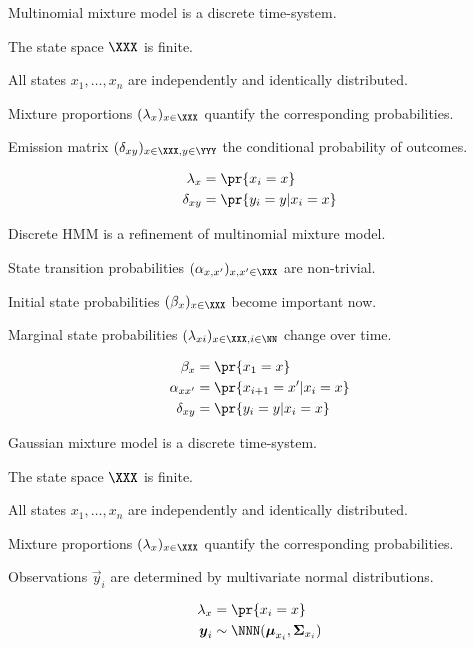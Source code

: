 \documentclass[landscape,footrule]{foils}
\begin{document}



Multinomial mixture model is a discrete time-system.
\begin{triangles}
\item The state space $\XXX$ is finite.
\item All states $x_1,\ldots,x_n$ are independently and identically distributed.
\item Mixture proportions $(\lambda_{x})_{x\in\XXX}$ quantify the corresponding probabilities.
\item Emission matrix $(\delta_{xy})_{x\in\XXX, y\in\YYY}$ the conditional probability of outcomes.  
\end{triangles}
\begin{align*}
\lambda_x&=\pr{x_i=x}\\
\delta_{xy}&=\pr{y_i=y|x_i=x}
\end{align*}



Discrete HMM is a refinement of multinomial mixture model.
\begin{triangles}
\item State transition probabilities $(\alpha_{x,x'})_{x,x'\in\XXX}$ are non-trivial.
\item Initial state probabilities $(\beta_{x})_{x\in\XXX}$ become important now.
\item Marginal state probabilities $(\lambda_{xi})_{x\in\XXX,i\in\NN}$ change over time.
\end{triangles}
\begin{align*}
\beta_x&=\pr{x_1=x}\\
\alpha_{xx'}&=\pr{x_{i+1}=x'|x_{i}=x}\\
\delta_{xy}&=\pr{y_i=y|x_i=x}
\end{align*}



Gaussian mixture model is a discrete time-system.
\begin{triangles}
\item The state space $\XXX$ is finite.
\item All states $x_1,\ldots,x_n$ are independently and identically distributed.
\item Mixture proportions $(\lambda_{x})_{x\in\XXX}$ quantify the corresponding probabilities.
\item Observations $\vec{y}_i$ are  determined by multivariate normal distributions.
\end{triangles}
\begin{align*}
\lambda_x&=\pr{x_i=x}\\
\vec{y}_i&\sim\NNN(\vec{\mu}_{x_i},\vec{\Sigma}_{x_i})
\end{align*}
\end{document}
